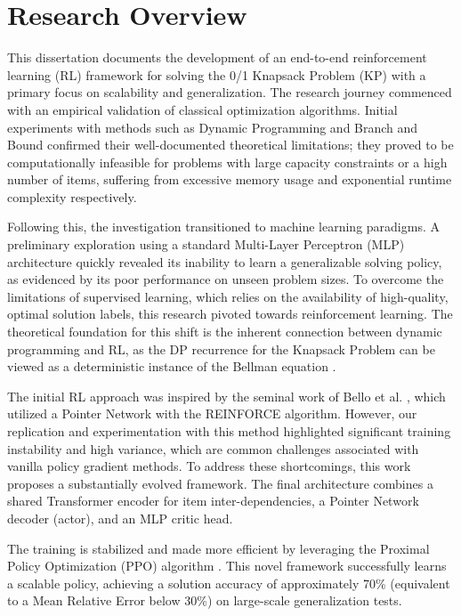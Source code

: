 \section{Research Overview}

This dissertation documents the development of an end-to-end reinforcement learning (RL) framework for solving the 0/1 Knapsack Problem (KP) with a primary focus on scalability and generalization. The research journey commenced with an empirical validation of classical optimization algorithms. Initial experiments with methods such as Dynamic Programming and Branch and Bound confirmed their well-documented theoretical limitations; they proved to be computationally infeasible for problems with large capacity constraints or a high number of items, suffering from excessive memory usage and exponential runtime complexity respectively.

Following this, the investigation transitioned to machine learning paradigms. A preliminary exploration using a standard Multi-Layer Perceptron (MLP) architecture quickly revealed its inability to learn a generalizable solving policy, as evidenced by its poor performance on unseen problem sizes. To overcome the limitations of supervised learning, which relies on the availability of high-quality, optimal solution labels, this research pivoted towards reinforcement learning. The theoretical foundation for this shift is the inherent connection between dynamic programming and RL, as the DP recurrence for the Knapsack Problem can be viewed as a deterministic instance of the Bellman equation \cite{tamarValueIterationNetworks2017}.

The initial RL approach was inspired by the seminal work of Bello et al. \cite{belloNeuralCombinatorialOptimization2017}, which utilized a Pointer Network with the REINFORCE algorithm. However, our replication and experimentation with this method highlighted significant training instability and high variance, which are common challenges associated with vanilla policy gradient methods. To address these shortcomings, this work proposes a substantially evolved framework.
The final architecture combines a shared Transformer encoder for item inter-dependencies, a Pointer Network decoder (actor), and an MLP critic head.

The training is stabilized and made more efficient by leveraging the Proximal Policy Optimization (PPO) algorithm \cite{schulmanProximalPolicyOptimization2017}. 
This novel framework successfully learns a scalable policy, achieving a solution accuracy of approximately 70\% (equivalent to a Mean Relative Error below 30\%) on large-scale generalization tests.
